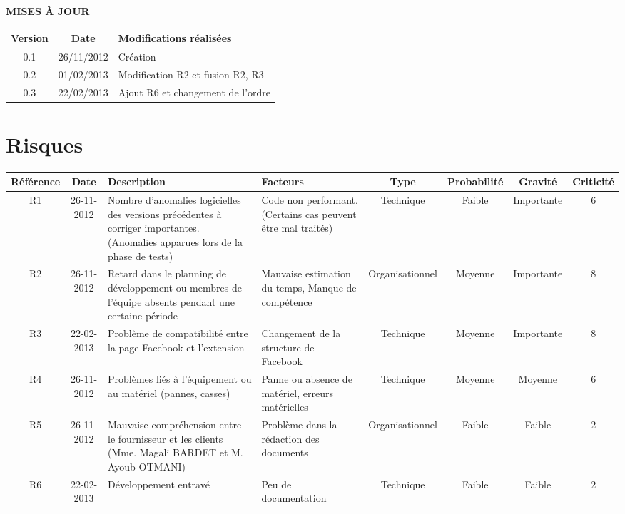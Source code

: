 \documentclass[a4paper,11pt,french]{article}
\begin{document}
\makeFirstPage
\clearpage
\vspace*{1cm}
\begin{center}
\textbf{\huge{MISES À JOUR}}\\
\vspace*{3cm}
	\begin{tabularx}{16cm}{|c|c|X|}
    \hline
	\bfseries{Version} & \bfseries{Date} & \bfseries{Modifications réalisées}\\
	\hline
	0.1 & 26/11/2012 & Création\\
	\hline
	0.2 & 01/02/2013 & Modification R2 et fusion R2, R3\\
	\hline
	0.3 & 22/02/2013 & Ajout R6 et changement de l'ordre\\
	\hline
	\end{tabularx}
\end{center}

\clearpage

\section{Risques}
\begin{flushleft}
\begin{small} 
\begin{tabularx}{18cm}{|c|c|p{2.28cm}|p{2cm}|c|c|c|c|}
\hline
\cellcolor[gray]{.7} Référence & \cellcolor[gray]{.7} Date & 
\cellcolor[gray]{.7}Description & \cellcolor[gray]{.7}Facteurs & 
\cellcolor[gray]{.7}Type & \cellcolor[gray]{.7}Probabilité & 
\cellcolor[gray]{.7}Gravité &
\cellcolor[gray]{.7}Criticité\\
\hline
R1 & 26-11-2012 & 
Nombre d'anomalies logicielles des versions précédentes
à  corriger importantes. (Anomalies apparues lors de la phase de tests)
& Code non performant. (Certains cas peuvent être mal traités)
& Technique & Faible & Importante & 6 \\
\hline
R2 & 26-11-2012 &
Retard dans le planning de
développement ou membres de l'équipe absents pendant une certaine période
& Mauvaise estimation du temps, Manque de compétence
& Organisationnel & Moyenne & Importante & 8 \\
\hline 
R3 & 22-02-2013 & Problème de compatibilité entre la page Facebook 
et l'extension
& Changement de la structure de Facebook
& Technique & Moyenne & Importante & 8 \\
\hline
R4 & 26-11-2012 &
Problèmes liés à l'équipement ou au matériel (pannes, casses)
& 
Panne ou absence de matériel, erreurs matérielles 
& Technique & Moyenne & Moyenne & 6 \\
\hline
R5 & 26-11-2012 & Mauvaise compréhension entre le
fournisseur et les clients (Mme. Magali BARDET et M. Ayoub OTMANI)
& Problème dans la rédaction des documents
& Organisationnel & Faible & Faible & 2 \\
\hline
R6 & 22-02-2013 & Développement entravé
& Peu de documentation
& Technique & Faible & Faible & 2 \\
\hline



\end{tabularx}

\end{small}
\end{flushleft}
\end{document}
